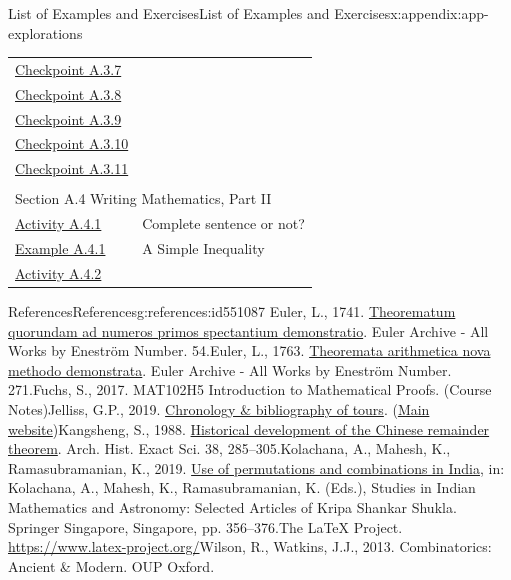 \documentclass[oneside,10pt,]{book}
\numberwithin{equation}{section}
\providecommand\phantomsection{}
\begin{document}
\begin{appendixptx}{List of Examples and Exercises}{}{List of Examples and Exercises}{}{}{x:appendix:app-explorations}
\begin{longtable}[l]{ll}
\hyperref[x:exercise:ex-evaluate-2-no-sentence]{Checkpoint A.3.7}& \\
\hyperref[x:exercise:ex-evaluate-2-3]{Checkpoint A.3.8}& \\
\hyperref[x:exercise:ex-evaluate-2-a1b0]{Checkpoint A.3.9}& \\
\hyperref[x:exercise:ex-evaluate-2-2]{Checkpoint A.3.10}& \\
\hyperref[x:exercise:ex-evaluate-2-3b]{Checkpoint A.3.11}& \\
\multicolumn{2}{l}{\null}\\[1.5ex] \multicolumn{2}{l}{\large Section A.4 Writing Mathematics, Part II}\\[0.5ex]
\hyperref[x:activity:ex-writing-grammar]{Activity A.4.1}& Complete sentence or not?\\
\hyperref[x:example:eg-writing-two-column]{Example A.4.1}& A Simple Inequality\\
\hyperref[x:activity:exe-review-proof-writing]{Activity A.4.2}& \\
\end{longtable}
\end{appendixptx}
%
\backmatter%
%
\clearpage\phantomsection%
%
%
%
\typeout{************************************************}
\typeout{************************************************}
%
\begin{references-chapter-numberless}{References}{}{References}{}{}{g:references:id551087}
Euler, L., 1741. \href{https://scholarlycommons.pacific.edu/euler-works/54/}{Theorematum quorundam ad numeros primos spectantium demonstratio}. Euler Archive - All Works by Eneström Number. 54.Euler, L., 1763. \href{https://scholarlycommons.pacific.edu/euler-works/271/}{Theoremata arithmetica nova methodo demonstrata}. Euler Archive - All Works by Eneström Number. 271.Fuchs, S., 2017. MAT102H5 Introduction to Mathematical Proofs. (Course Notes)Jelliss, G.P., 2019. \href{https://www.mayhematics.com/p/KTN12_Bibliography.pdf}{Chronology \& bibliography of tours}. (\href{https://www.mayhematics.com/p/p.htm}{Main website})Kangsheng, S., 1988. \href{https://doi.org/10.1007/BF00357063}{Historical development of the Chinese remainder theorem}. Arch. Hist. Exact Sci. 38, 285–305.Kolachana, A., Mahesh, K., Ramasubramanian, K., 2019. \href{https://doi.org/10.1007/978-981-13-7326-8_18}{Use of permutations and combinations in India}, in: Kolachana, A., Mahesh, K., Ramasubramanian, K. (Eds.), Studies in Indian Mathematics and Astronomy: Selected Articles of Kripa Shankar Shukla. Springer Singapore, Singapore, pp. 356–376.The LaTeX Project. \href{https://www.latex-project.org/}{https:\slash{}\slash{}www.latex-project.org\slash{}}Wilson, R., Watkins, J.J., 2013. Combinatorics: Ancient \& Modern. OUP Oxford.\end{references-chapter-numberless}
\end{document}
